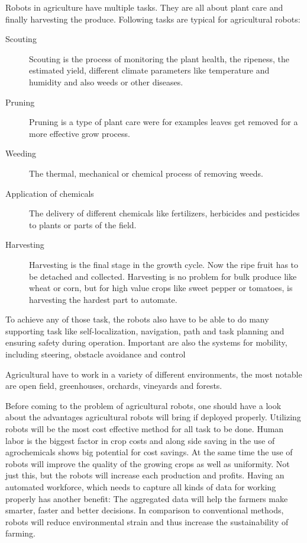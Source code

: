     Robots in agriculture have multiple tasks. They are all about plant care and finally harvesting the produce. Following tasks are typical for agricultural robots: 
    \begin{description}
        \item[Scouting] Scouting is the process of monitoring the plant health, the ripeness, the estimated yield, different climate parameters like temperature and humidity and also weeds or other diseases.
        \item[Pruning] Pruning is a type of plant care were for examples leaves get removed for a more effective grow process.
        \item[Weeding] The thermal, mechanical or chemical process of removing weeds.
        \item[Application of chemicals] The delivery of different chemicals like fertilizers, herbicides and pesticides to plants or parts of the field.
        \item[Harvesting] Harvesting is the final stage in the growth cycle. Now the ripe fruit has to be detached and collected. Harvesting is no problem for bulk produce like wheat or corn, but for high value crops like sweet pepper or tomatoes, is harvesting the hardest part to automate.
    \end{description}

    To achieve any of those task, the robots also have to be able to do many supporting task like self-localization, navigation, path and task planning and ensuring safety during operation. Important are also the systems for mobility, including steering, obstacle avoidance and control

    Agricultural have to work in a variety of different environments, the most notable are open field, greenhouses, orchards, vineyards and forests.

    Before coming to the problem of agricultural robots, one should have a look about the advantages agricultural robots will bring if deployed properly. Utilizing robots will be the most cost effective method for all task to be done. Human labor is the biggest factor in crop costs and along side saving in the use of agrochemicals shows big potential for cost savings. At the same time the use of robots will improve the quality of the growing crops as well as uniformity. Not just this, but the robots will increase each production and profits. Having an automated workforce, which needs to capture all kinds of data for working properly has another benefit: The aggregated data will help the farmers make smarter, faster and better decisions. In comparison to conventional methods, robots will reduce environmental strain and thus increase the sustainability of farming. \cite{Bechar2016}


